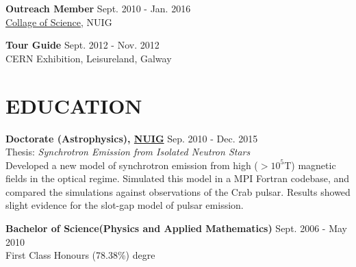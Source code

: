 \documentclass[margin, 10pt]{res} %
\begin{document}
\begin{resume}
 
{\bf Outreach Member} \hfill Sept. 2010 - Jan. 2016 \\
\href{http://www.nuigalway.ie/science/}{Collage of Science}, NUIG


{\bf Tour Guide} \hfill Sept. 2012 - Nov. 2012 \\
CERN Exhibition, Leisureland, Galway





% 



\section{EDUCATION}
{\bf Doctorate (Astrophysics),  \href{http://www.nuig.ie}{NUIG} }\hfill Sep. 2010 - Dec. 2015 \\
 Thesis: {\sl Synchrotron Emission from Isolated Neutron Stars}\\
Developed a new model of synchrotron emission from high ($>10^{5}$T) magnetic fields in the optical regime. Simulated 
this model in a MPI Fortran codebase, and compared the simulations against observations of the Crab pulsar. Results showed slight evidence for the slot-gap model of pulsar emission.

{\bf Bachelor of Science(Physics and Applied Mathematics)} \hfill Sept. 2006 - May 2010 \\
 First Class Honours (78.38\%) degre \\


\end{resume}
\end{document}
